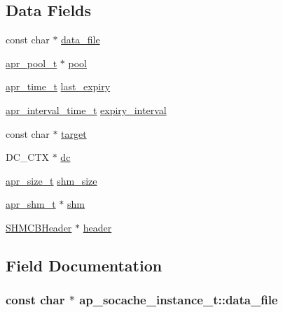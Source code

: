 \subsection*{Data Fields}
\begin{DoxyCompactItemize}
\item 
const char $\ast$ \hyperlink{structap__socache__instance__t_af5782d0aacfb61c7bd6f73f0543dcb0b}{data\+\_\+file}
\item 
\hyperlink{structapr__pool__t}{apr\+\_\+pool\+\_\+t} $\ast$ \hyperlink{structap__socache__instance__t_af814a2dffa2e0dceaa9447d012d93540}{pool}
\item 
\hyperlink{group__apr__time_gadb4bde16055748190eae190c55aa02bb}{apr\+\_\+time\+\_\+t} \hyperlink{structap__socache__instance__t_ae38319e8dce8285d7b65720ac6dd37f7}{last\+\_\+expiry}
\item 
\hyperlink{group__apr__time_gaae2129185a395cc393f76fabf4f43e47}{apr\+\_\+interval\+\_\+time\+\_\+t} \hyperlink{structap__socache__instance__t_a320ef8bd6626acaae04ccb058d7d13bf}{expiry\+\_\+interval}
\item 
const char $\ast$ \hyperlink{structap__socache__instance__t_ae073e4460e075701ae25682192536544}{target}
\item 
D\+C\+\_\+\+C\+TX $\ast$ \hyperlink{structap__socache__instance__t_a1909c853427725330051f69ac8037b41}{dc}
\item 
\hyperlink{group__apr__platform_gaaa72b2253f6f3032cefea5712a27540e}{apr\+\_\+size\+\_\+t} \hyperlink{structap__socache__instance__t_a950846af69da26bb04e9ee685f49fdbc}{shm\+\_\+size}
\item 
\hyperlink{structapr__shm__t}{apr\+\_\+shm\+\_\+t} $\ast$ \hyperlink{structap__socache__instance__t_af61eb0fa997bf4c0c6734294d3cd1fd6}{shm}
\item 
\hyperlink{structSHMCBHeader}{S\+H\+M\+C\+B\+Header} $\ast$ \hyperlink{structap__socache__instance__t_a9bb9bbdad7cd670ee4b2a3a5fbf96f97}{header}
\end{DoxyCompactItemize}


\subsection{Field Documentation}
\subsubsection[{\texorpdfstring{data\+\_\+file}{data_file}}]{\setlength{\rightskip}{0pt plus 5cm}const char $\ast$ ap\+\_\+socache\+\_\+instance\+\_\+t\+::data\+\_\+file}\hypertarget{structap__socache__instance__t_af5782d0aacfb61c7bd6f73f0543dcb0b}{}\label{structap__socache__instance__t_af5782d0aacfb61c7bd6f73f0543dcb0b}
